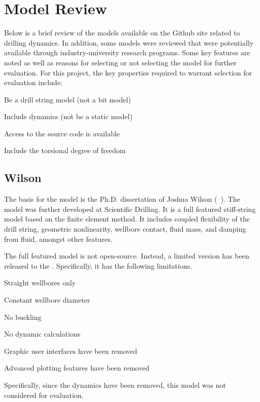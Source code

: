 \chapter{Model Review}
\label{ch:modelreview}
Below is a brief review of the models available on the \osdc{} Github site related to drilling dynamics.  In addition, some models were reviewed that were potentially available through industry-university research programs.  Some key features are noted as well as reasons for selecting or not selecting the model for further evaluation.  For this project, the key properties required to warrant selection for evaluation include:
\begin{bulletedlist}
	\item Be a drill string model (not a bit model)
	\item Include dynamics (not be a static model)
	\item Access to the source code is available
	\item Include the torsional degree of freedom
\end{bulletedlist}

\section{Wilson}
The basis for the model is the Ph.D. dissertation of Joshua Wilson (~\cite{ref:wilson2017a}).  The model was further developed at Scientific Drilling.  It is a full featured stiff-string model based on the finite element method.  It includes coupled flexibility of the drill string, geometric nonlinearity, wellbore contact, fluid mass, and damping from fluid, amongst other features.

The full featured model is not open-source.  Instead, a limited version has been released to the \osdc{}.  Specifically, it has the following limitations.
\begin{bulletedlist}
	\item Straight wellbores only
	\item Constant wellbore diameter
	\item No buckling
	\item No dynamic calculations
	\item Graphic user interfaces have been removed
	\item Advanced plotting features have been removed
\end{bulletedlist}
Specifically, since the dynamics have been removed, this model was not considered for evaluation.


